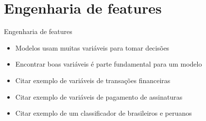 \section{Engenharia de features}

\begin{frame}	
	\begin{block}{Engenharia de features}
		\begin{itemize}
			\item Modelos usam muitas variáveis para tomar decisões
			\item Encontrar boas variáveis é parte fundamental para um modelo
			\item Citar exemplo de variáveis de transações financeiras
			\item Citar exemplo de variáveis de pagamento de assinaturas
			\item Citar exemplo de um classificador de brasileiros e peruanos			
		\end{itemize}		
	\end{block}
\end{frame}

